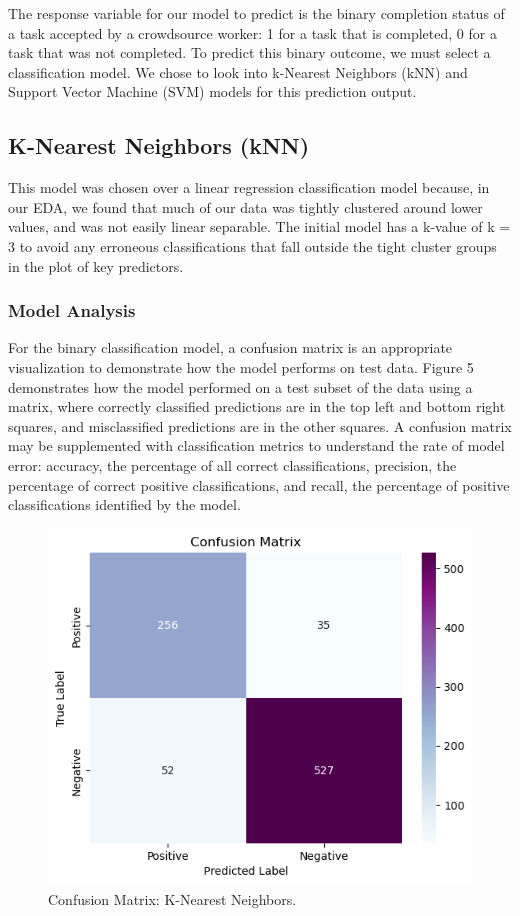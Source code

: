 \documentclass[11pt]{article}
\begin{document}
The response variable for our model to predict is the binary completion status of a task accepted by a crowdsource worker: 1 for a task that is completed, 0 for a task that was not completed. To predict this binary outcome, we must select a classification model. We chose to look into k-Nearest Neighbors (kNN) and Support Vector Machine (SVM) models for this prediction output.

\subsection{K-Nearest Neighbors (kNN)}
This model was chosen over a linear regression classification model because, in our EDA, we found that much of our data was tightly clustered around lower values, and was not easily linear separable. The initial model has a k-value of k = 3 to avoid any erroneous classifications that fall outside the tight cluster groups in the plot of key predictors.

\subsubsection{Model Analysis}
For the binary classification model, a confusion matrix is an appropriate visualization to demonstrate how the model performs on test data. Figure 5 demonstrates how the model performed on a test subset of the data using a matrix, where correctly classified predictions are in the top left and bottom right squares, and misclassified predictions are in the other squares. A confusion matrix may be supplemented with classification metrics to understand the rate of model error: accuracy, the percentage of all correct classifications, precision, the percentage of correct positive classifications, and recall, the percentage of positive classifications identified by the model.

\begin{figure}[hbt!]
  \centering
  \includegraphics[width=375pt]{figures/confusion-matrix-knn}
  \caption{Confusion Matrix: K-Nearest Neighbors.}
\end{figure}
\end{document}
